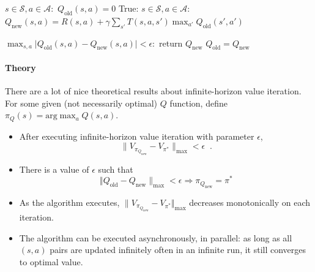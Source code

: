 \begin{codebox}
  \li     \For $s \in \mathcal{S}, a \in \mathcal{A}:$
	\Do
  \li        $Q_{\text{old}}(s, a) = 0$
        \End
  \li     \While True:
        \Do
  \li        \For $s \in \mathcal{S}, a \in \mathcal{A}:$
           \Do
  \li           $Q_{\text{new}}(s, a) = R(s, a) + \gamma\sum_{s'}T(s, a, s')\max_{a'}Q_{\text{old}}(s', a')$
         \End

  \li      \If $\max_{s, a}\lvert Q_{\text{old}}(s, a) - Q_{\text{new}}(s, a)\rvert < \epsilon:$
         \Do
  \li           return $Q_{\text{new}}$
        \End
  \li      $Q_{\text{old}} = Q_{\text{new}}$
	\End
\end{codebox}

\paragraph*{Theory}

There are a lot of nice theoretical results about infinite-horizon value iteration.
For some given (not necessarily optimal) $Q$ function, define
$\pi_{Q}(s) = \text{arg}\max_{a}Q(s, a)$.   
\begin{itemize}
\item After executing infinite-horizon value
iteration with parameter $\epsilon$,  
\begin{equation}
\lVert  V_{\pi_{Q_{\text{new}}}} - V_{\pi^*} \rVert_{\text{max}} < \epsilon \;\; .
\end{equation}
%
\item
There is a value of $\epsilon$ such that
\begin{equation}
 \Vert Q_{\text{old}} - Q_{\text{new}} \rVert_{\text{max}} <
\epsilon \Longrightarrow \pi_{Q_{\text{new}}} = \pi^* 
\end{equation}  
\item  As the algorithm executes,   
$\lVert V_{\pi_{Q_{\text{new}}}} - V_{\pi^*} \Vert_{\text{max}}$ decreases
monotonically on each iteration.
\item The algorithm  can be executed asynchronously, in parallel: as
  long as all $(s, a)$ pairs are updated infinitely often in an
  infinite run, it still converges to optimal value. 

\end{itemize}

